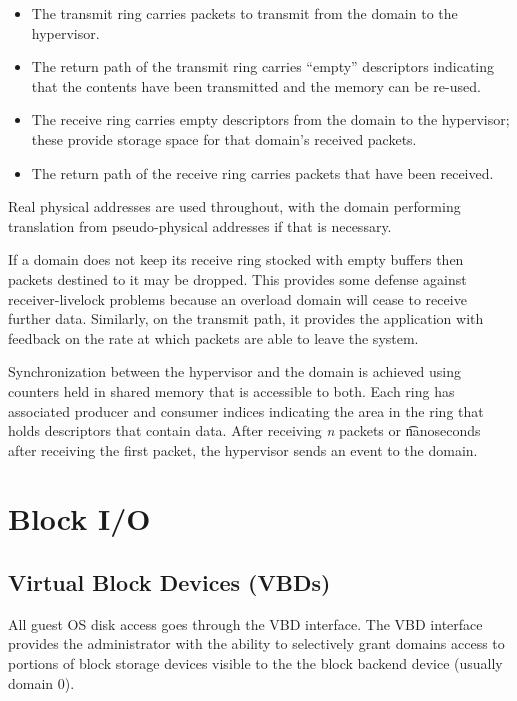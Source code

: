 \documentclass[11pt,twoside,final,openright]{xenstyle}
\begin{document}
\begin{itemize}

\item The transmit ring carries packets to transmit from the domain to the
hypervisor.

\item The return path of the transmit ring carries ``empty'' descriptors
indicating that the contents have been transmitted and the memory can be
re-used.

\item The receive ring carries empty descriptors from the domain to the 
hypervisor; these provide storage space for that domain's received packets.

\item The return path of the receive ring carries packets that have been
received.
\end{itemize}

Real physical addresses are used throughout, with the domain performing 
translation from pseudo-physical addresses if that is necessary.

If a domain does not keep its receive ring stocked with empty buffers then 
packets destined to it may be dropped.  This provides some defense against 
receiver-livelock problems because an overload domain will cease to receive
further data.  Similarly, on the transmit path, it provides the application
with feedback on the rate at which packets are able to leave the system.

Synchronization between the hypervisor and the domain is achieved using 
counters held in shared memory that is accessible to both.  Each ring has
associated producer and consumer indices indicating the area in the ring
that holds descriptors that contain data.  After receiving {\it n} packets
or {\t nanoseconds} after receiving the first packet, the hypervisor sends
an event to the domain. 

\chapter{Block I/O}

\section{Virtual Block Devices (VBDs)}

All guest OS disk access goes through the VBD interface.  The VBD
interface provides the administrator with the ability to selectively
grant domains access to portions of block storage devices visible to
the the block backend device (usually domain 0).
\end{document}
